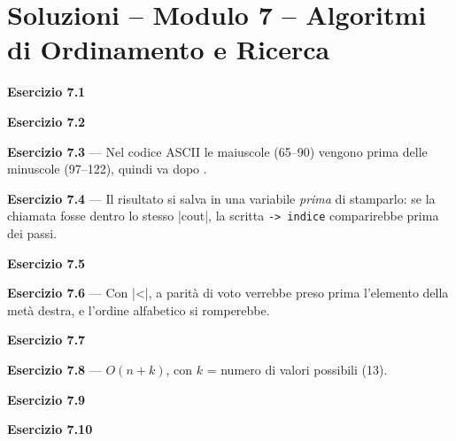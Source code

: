 \chapter{Soluzioni -- Modulo 7 -- Algoritmi di Ordinamento e Ricerca}
\textbf{Esercizio 7.1}

\textbf{Esercizio 7.2}

\textbf{Esercizio 7.3} --- Nel codice ASCII le maiuscole (65--90) vengono prima delle
minuscole (97--122), quindi  va dopo .

\textbf{Esercizio 7.4} --- Il risultato si salva in una variabile \emph{prima} di
stamparlo: se la chiamata fosse dentro lo stesso \cc|cout|, la scritta
\texttt{-> indice} comparirebbe prima dei passi.

\textbf{Esercizio 7.5}

\textbf{Esercizio 7.6} --- Con \cc|<|, a parità di voto verrebbe preso prima
l'elemento della metà destra, e l'ordine alfabetico si romperebbe.

\textbf{Esercizio 7.7}

\textbf{Esercizio 7.8} --- $O(n + k)$, con $k$ = numero di valori possibili (13).

\textbf{Esercizio 7.9}

\textbf{Esercizio 7.10}
